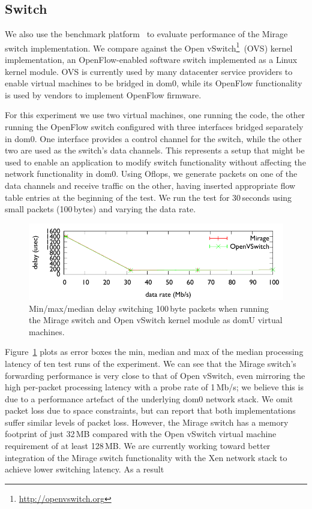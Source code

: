 \subsection{\mirage Switch}

We also use the \oflops benchmark platform~\cite{oflops} to evaluate
performance of the Mirage switch implementation. We compare against the Open
vSwitch\footnote{\url{http://openvswitch.org}}~(OVS) kernel implementation, an
OpenFlow-enabled software switch implemented as a Linux kernel module. OVS is
currently used by many datacenter service providers to enable virtual machines
to be bridged in dom0, while its OpenFlow functionality is used by vendors to
implement OpenFlow firmware.

For this experiment we use two virtual machines, one running the \oflops code,
the other running the OpenFlow switch configured with three interfaces bridged
separately in dom0. One interface provides a control channel for the switch,
while the other two are used as the switch's data channels. This represents a
setup that might be used to enable an application to modify switch
functionality without affecting the network functionality in dom0. Using
Oflops, we generate packets on one of the data channels and receive traffic on
the other, having inserted appropriate flow table entries at the beginning of
the test. We run the test for 30\,seconds using small packets (100\,bytes) and
varying the data rate.

\begin{figure}
\centering
\includegraphics[width=\columnwidth]{switch-media-delay}
\caption{\label{fig:switch}Min/max/median delay switching 100\,byte packets
        when running the Mirage switch and Open vSwitch kernel module as domU
        virtual machines.}
\vspace{-2ex}
\end{figure}

Figure~\ref{fig:switch} plots as error boxes the min, median and max of the
median processing latency of ten test runs of the experiment. We can see that
the Mirage switch's forwarding performance is very close to that of Open
vSwitch, even mirroring the high per-packet processing latency with a probe
rate of 1\,Mb/s; we believe this is due to a performance artefact of the
underlying dom0 network stack. We omit packet loss due to space constraints,
but can report that both implementations suffer similar levels of packet loss.
However, the Mirage switch has a memory footprint of just 32\,MB compared with
the Open vSwitch virtual machine requirement of at least 128\,MB. We are
currently working toward better integration of the Mirage switch functionality
with the Xen network stack to achieve lower switching latency. As a result 

